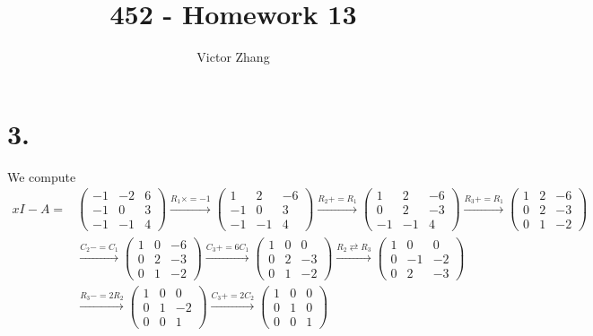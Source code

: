 \documentclass{article}
\title{452 - Homework 13}
\author{Victor Zhang}
\date{}
\begin{document}
\maketitle

\section*{3.}
We compute
\begin{equation*}
\begin{split}
xI - A =
&\begin{pmatrix}
-1 & -2 & 6 \\
-1 & 0 & 3 \\
-1 & -1 & 4 
\end{pmatrix}
\xrightarrow[]{R_1 \times= -1}
\begin{pmatrix}
1 & 2 & -6 \\
-1 & 0 & 3 \\
-1 & -1 & 4 
\end{pmatrix}
\xrightarrow[]{R_2 += R_1}
\begin{pmatrix}
1 & 2 & -6 \\
0 & 2 & -3 \\
-1 & -1 & 4 
\end{pmatrix}
\xrightarrow[]{R_3 += R_1}
\begin{pmatrix}
1 & 2 & -6 \\
0 & 2 & -3 \\
0 & 1 & -2 
\end{pmatrix}\\
&\xrightarrow[]{C_2 -= C_1}
\begin{pmatrix}
1 & 0 & -6 \\
0 & 2 & -3 \\
0 & 1 & -2 
\end{pmatrix}
\xrightarrow[]{C_3 += 6C_1}
\begin{pmatrix}
1 & 0 & 0 \\
0 & 2 & -3 \\
0 & 1 & -2 
\end{pmatrix}
\xrightarrow[]{R_2 \rightleftarrows R_3}
\begin{pmatrix}
1 & 0 & 0 \\
0 & -1 & -2 \\
0 & 2 & -3 
\end{pmatrix}\\
&\xrightarrow[]{R_3 -= 2R_2}
\begin{pmatrix}
1 & 0 & 0 \\
0 & 1 & -2 \\
0 & 0 & 1 
\end{pmatrix}
\xrightarrow[]{C_3 += 2C_2}
\begin{pmatrix}
1 & 0 & 0 \\
0 & 1 & 0 \\
0 & 0 & 1 
\end{pmatrix}
\end{split}
\end{equation*}
\end{document}
